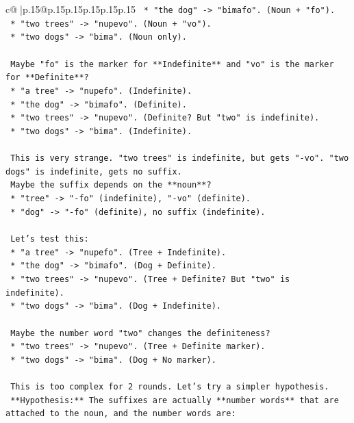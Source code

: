 \documentclass{article}
\begin{document}
{\begin{supertabular}{c@{$\;$}|p{.15\linewidth}@{}p{.15\linewidth}p{.15\linewidth}p{.15\linewidth}p{.15\linewidth}p{.15\linewidth}}
{{{\texttt{    *   "the dog" {-}> "bimafo". (Noun + "fo").} \\
\texttt{    *   "two trees" {-}> "nupevo". (Noun + "vo").} \\
\texttt{    *   "two dogs" {-}> "bima". (Noun only).} \\
\\ 
\texttt{    Maybe "fo" is the marker for **Indefinite** and "vo" is the marker for **Definite**?} \\
\texttt{    *   "a tree" {-}> "nupefo". (Indefinite).} \\
\texttt{    *   "the dog" {-}> "bimafo". (Definite).} \\
\texttt{    *   "two trees" {-}> "nupevo". (Definite? But "two" is indefinite).} \\
\texttt{    *   "two dogs" {-}> "bima". (Indefinite).} \\
\\ 
\texttt{    This is very strange. "two trees" is indefinite, but gets "{-}vo". "two dogs" is indefinite, gets no suffix.} \\
\texttt{    Maybe the suffix depends on the **noun**?} \\
\texttt{    *   "tree" {-}> "{-}fo" (indefinite), "{-}vo" (definite).} \\
\texttt{    *   "dog" {-}> "{-}fo" (definite), no suffix (indefinite).} \\
\\ 
\texttt{    Let's test this:} \\
\texttt{    *   "a tree" {-}> "nupefo". (Tree + Indefinite).} \\
\texttt{    *   "the dog" {-}> "bimafo". (Dog + Definite).} \\
\texttt{    *   "two trees" {-}> "nupevo". (Tree + Definite? But "two" is indefinite).} \\
\texttt{    *   "two dogs" {-}> "bima". (Dog + Indefinite).} \\
\\ 
\texttt{    Maybe the number word "two" changes the definiteness?} \\
\texttt{    *   "two trees" {-}> "nupevo". (Tree + Definite marker).} \\
\texttt{    *   "two dogs" {-}> "bima". (Dog + No marker).} \\
\\ 
\texttt{    This is too complex for 2 rounds. Let's try a simpler hypothesis.} \\
\texttt{    **Hypothesis:** The suffixes are actually **number words** that are attached to the noun, and the number words are:} \\
}}}
\end{supertabular}}
\end{document}
